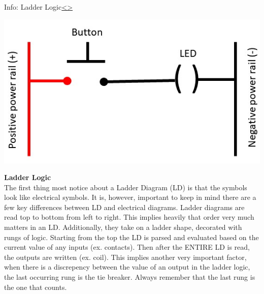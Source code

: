 \documentclass[12pt]{extarticle}
\newenvironment{instructionblock}{\Large\bgroup}{\egroup}
\newcounter{next}
\newcounter{prev}
\begin{document}
\pagebreak
{}
\begin{slide}{Info: Ladder Logic}{\hyperref[slide \theprev]{\textless}\hyperref[slide \thenext]{\textgreater}}
\begin{instructionblock}
\begin{center}
	\includegraphics[scale=1]{Images/LadderDiagram01.JPG}
\end{center}
\end{instructionblock}
\end{slide} 
\vfill
\noindent
\textbf{Ladder Logic}\\
The first thing most notice about a Ladder Diagram (LD) is that the symbols look like electrical symbols. It is, however, important to keep in mind there are a few key differences between LD and electrical diagrams. Ladder diagrams are read top to bottom from left to right. This implies heavily that order very much matters in an LD. Additionally, they take on a ladder shape, decorated with rungs of logic. Starting from the top the LD is parsed and evaluated based on the current value of any inputs (ex. contacts). Then after the ENTIRE LD is read, the outputs are written (ex. coil). This implies another very important factor, when there is a discrepency between the value of an output in the ladder logic, the last occurring rung is the tie breaker. Always remember that the last rung is the one that counts. \cite{PLC_acad}

\end{document}
